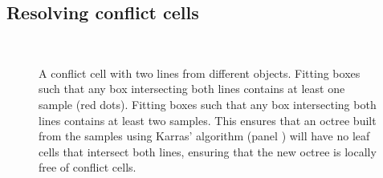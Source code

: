 \documentclass{egpubl}
\begin{document}
\subsection{Resolving conflict cells}

\begin{figure}
  \centering
   \\
  \caption{
    \protect{} A conflict cell with two lines from different objects.
    \protect{} Fitting boxes such that any box intersecting both lines contains at least one sample (red dots).
    \protect{} Fitting boxes such that any box intersecting both lines contains at least two samples. This ensures that an octree built from the samples using Karras' algorithm (panel \protect{}) will have no leaf cells that intersect both lines, ensuring that the new octree is locally free of conflict cells.
  }
  \label{fig:conflict-resolution}
\end{figure}


\end{document}
